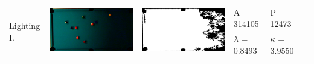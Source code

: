 \begin{tabular}{|l|c|c|l|l|c|}
\multirow{2}{*}{Lighting I.} & \multirow{2}{*}{\includegraphics[scale=0.05]{../images/1/7_img.png}} & \multirow{2}{*}{\includegraphics[scale=0.05]{../images/1/7_mask.png}} & A = 314105 & P = 12473 & \multirow{2}{*}{}\\ 
& & & $\lambda$ = 0.8493 & $\kappa$ = 3.9550 & \\
\hline


\end{tabular}

